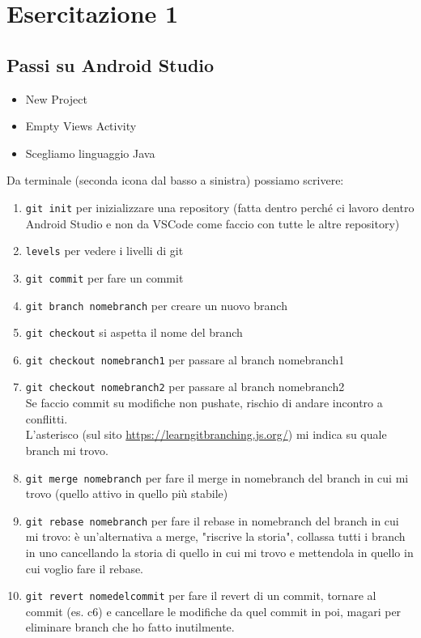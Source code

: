 
\chapter{Esercitazione 1}
\section{Passi su Android Studio}
\begin{itemize}
    \item New Project
    \item Empty Views Activity
    \item Scegliamo linguaggio Java
\end{itemize}
\par Da terminale (seconda icona dal basso a sinistra) possiamo scrivere:
\begin{enumerate}
    \item \texttt{git init} per inizializzare una repository (fatta dentro perché ci lavoro dentro Android Studio e non da VSCode come faccio con tutte le altre repository)
    \item \texttt{levels} per vedere i livelli di git
    \item \texttt{git commit} per fare un commit
    \item \texttt{git branch nomebranch} per creare un nuovo branch
    \item \texttt{git checkout} si aspetta il nome del branch
    \item \texttt{git checkout nomebranch1} per passare al branch nomebranch1
    \item \texttt{git checkout nomebranch2} per passare al branch nomebranch2\\
    Se faccio commit su modifiche non pushate, rischio di andare incontro a conflitti.\\
    L'asterisco (sul sito \url{https://learngitbranching.js.org/}) mi indica su quale branch mi trovo.
    \item \texttt{git merge nomebranch} per fare il merge in nomebranch del branch in cui mi trovo (quello attivo in quello più stabile)
    \item \texttt{git rebase nomebranch} per fare il rebase in nomebranch del branch in cui mi trovo: è un'alternativa a merge, "riscrive la storia", collassa tutti i branch in uno cancellando la storia di quello in cui mi trovo e mettendola in quello in cui voglio fare il rebase.
    \item \texttt{git revert nomedelcommit} per fare il revert di un commit, tornare al commit (es. c6) e cancellare le modifiche da quel commit in poi, magari per eliminare branch che ho fatto inutilmente.
\end{enumerate}

